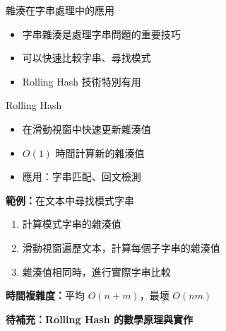 \documentclass{beamer}
\begin{document}
\begin{frame}{雜湊在字串處理中的應用}
\begin{itemize}
    \item 字串雜湊是處理字串問題的重要技巧
    \item 可以快速比較字串、尋找模式
    \item Rolling Hash 技術特別有用
\end{itemize}

\vspace{1em}
\begin{block}{Rolling Hash}
\begin{itemize}
    \item 在滑動視窗中快速更新雜湊值
    \item $O(1)$ 時間計算新的雜湊值
    \item 應用：字串匹配、回文檢測
\end{itemize}
\end{block}

\vspace{1em}
\textbf{範例：}在文本中尋找模式字串
\begin{enumerate}
    \item 計算模式字串的雜湊值
    \item 滑動視窗遍歷文本，計算每個子字串的雜湊值
    \item 雜湊值相同時，進行實際字串比較
\end{enumerate}

\vspace{1em}
\textbf{時間複雜度：}平均 $O(n + m)$，最壞 $O(nm)$

\vspace{1em}
\textbf{待補充：Rolling Hash 的數學原理與實作}
\end{frame}
\end{document}
